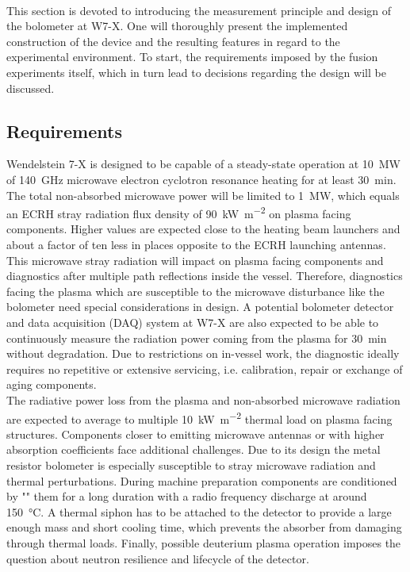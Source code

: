         \,\\%
%
        This section is devoted to introducing the measurement principle and design of the bolometer at W7-X. One will thoroughly present the implemented construction of the device and the resulting features in regard to the experimental environment. To start, the requirements imposed by the fusion experiments itself, which in turn lead to decisions regarding the design will be discussed.%
%
        \subsection{Requirements}\label{sec:requirements}%
%
            Wendelstein 7-X is designed to be capable of a steady-state operation at \SI{10}{\mega\watt} of \SI{140}{\giga\hertz} microwave electron cyclotron resonance heating for at least \SI{30}{\minute}. The total non-absorbed microwave power will be limited to \SI{1}{\mega\watt}, which equals an ECRH stray radiation flux density of \SI{90}{\kilo\watt\per\square\meter} on plasma facing components. Higher values are expected close to the heating beam launchers and about a factor of ten less in places opposite to the ECRH launching antennas\cite{Hathiramani2013}. This microwave stray radiation will impact on plasma facing components and diagnostics after multiple path reflections inside the vessel. Therefore, diagnostics facing the plasma which are susceptible to the microwave disturbance like the bolometer need special considerations in design\cite{Zhang2010}. A potential bolometer detector and data acquisition (DAQ) system at W7-X are also expected to be able to continuously measure the radiation power coming from the plasma for \SI{30}{\minute} without degradation. Due to restrictions on in-vessel work, the diagnostic ideally requires no repetitive or extensive servicing, i.e. calibration, repair or exchange of aging components.\\%
            The radiative power loss from the plasma and non-absorbed microwave radiation are expected to average to multiple \SI{10}{\kilo\watt\per\square\meter} thermal load on plasma facing structures. Components closer to emitting microwave antennas or with higher absorption coefficients face additional challenges\cite{Koenig2010,Burhenn2011}. Due to its design the metal resistor bolometer is especially susceptible to stray microwave radiation and thermal perturbations. During machine preparation components are conditioned by "" them for a long duration with a radio frequency discharge at around \SI{150}{\celsius}. A thermal siphon has to be attached to the detector to provide a large enough mass and short cooling time, which prevents the absorber from damaging through thermal loads. Finally, possible deuterium plasma operation imposes the question about neutron resilience and lifecycle of the detector.\\%
